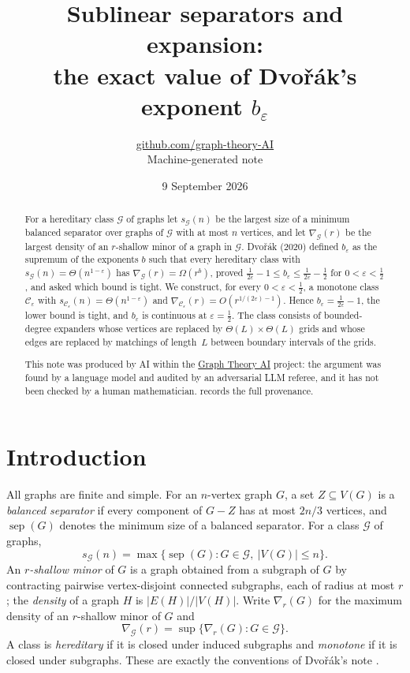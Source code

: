 \documentclass[11pt,a4paper]{article}
\title{Sublinear separators and expansion:\\ the exact value of Dvořák's exponent $b_\varepsilon$}
\author{\href{https://github.com/graph-theory-AI}{github.com/graph-theory-AI}\\[2pt] \normalsize Machine-generated note}
\date{9 September 2026}
\theoremstyle{plain}
\theoremstyle{definition}
\theoremstyle{remark}
\newcommand{\sep}{\operatorname{sep}}
\newcommand{\cC}{\mathcal C}
\newcommand{\cG}{\mathcal G}
\begin{document}
\maketitle


\begin{abstract}
For a hereditary class $\cG$ of graphs let $s_{\cG}(n)$ be the largest size of a minimum balanced separator over graphs of $\cG$ with at most $n$ vertices, and let $\nabla_{\cG}(r)$ be the largest density of an $r$-shallow minor of a graph in $\cG$. Dvořák (2020) defined $b_\varepsilon$ as the supremum of the exponents $b$ such that every hereditary class with $s_{\cG}(n)=\Theta(n^{1-\varepsilon})$ has $\nabla_{\cG}(r)=\Omega(r^{b})$, proved $\frac1{2\varepsilon}-1\le b_\varepsilon\le\frac1{2\varepsilon}-\frac12$ for $0<\varepsilon<\frac12$, and asked which bound is tight. We construct, for every $0<\varepsilon<\frac12$, a monotone class $\cC_\varepsilon$ with $s_{\cC_\varepsilon}(n)=\Theta(n^{1-\varepsilon})$ and $\nabla_{\cC_\varepsilon}(r)=O(r^{1/(2\varepsilon)-1})$. Hence $b_\varepsilon=\frac1{2\varepsilon}-1$, the lower bound is tight, and $b_\varepsilon$ is continuous at $\varepsilon=\frac12$. The class consists of bounded-degree expanders whose vertices are replaced by $\Theta(L)\times\Theta(L)$ grids and whose edges are replaced by matchings of length~$L$ between boundary intervals of the grids.

\medskip\noindent\small
This note was produced by AI within the \href{https://github.com/graph-theory-AI/Graph-Theory-LLM-Proofs}{Graph Theory AI} project:
the argument was found by a language model and audited by an adversarial LLM
referee, and it has not been checked by a human mathematician.
 records the full provenance.

\end{abstract}

\section{Introduction}\label{sec:intro}

All graphs are finite and simple. For an $n$-vertex graph $G$, a set $Z\subseteq V(G)$ is a \emph{balanced separator} if every component of $G-Z$ has at most $2n/3$ vertices, and $\sep(G)$ denotes the minimum size of a balanced separator. For a class $\cG$ of graphs,
\[
 s_{\cG}(n)=\max\{\sep(G): G\in\cG,\ |V(G)|\le n\}.
\]
An \emph{$r$-shallow minor} of $G$ is a graph obtained from a subgraph of $G$ by contracting pairwise vertex-disjoint connected subgraphs, each of radius at most $r$; the \emph{density} of a graph $H$ is $|E(H)|/|V(H)|$. Write $\nabla_r(G)$ for the maximum density of an $r$-shallow minor of $G$ and
\[
 \nabla_{\cG}(r)=\sup\{\nabla_r(G):G\in\cG\}.
\]
A class is \emph{hereditary} if it is closed under induced subgraphs and \emph{monotone} if it is closed under subgraphs. These are exactly the conventions of Dvořák's note \cite{Dvorak20}.
\end{document}
